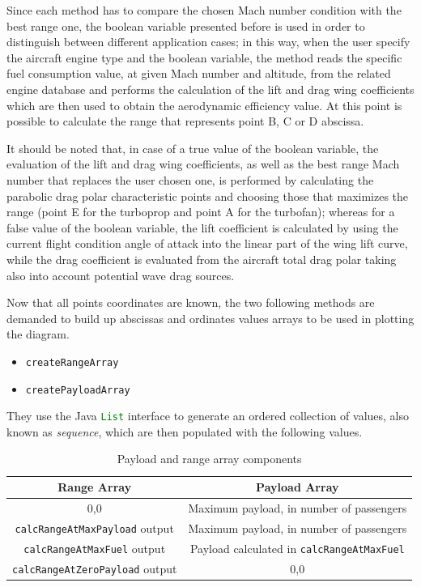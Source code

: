 \documentclass[a4paper,12pt,oneside]{book}
\begin{document}
\bigskip
Since each method has to compare the chosen Mach number condition with the best range one, the boolean variable presented before is used in order to distinguish between different application cases; in this way, when the user specify the aircraft engine type and the boolean variable, the method reads the specific fuel consumption value, at given Mach number and altitude, from the related engine database and performs the calculation of the lift and drag wing coefficients which are then used to obtain the aerodynamic efficiency value. At this point is possible to calculate the range that represents point B, C or D abscissa. 

It should be noted that, in case of a true value of the boolean variable, the evaluation of the lift and drag wing coefficients, as well as the best range Mach number that replaces the user chosen one, is performed by calculating the parabolic drag polar characteristic points and choosing those that maximizes the range (point E for the turboprop and point A for the turbofan); whereas for a false value of the boolean variable, the lift coefficient is calculated by using the current flight condition angle of attack into the linear part of the wing lift curve, while the drag coefficient is evaluated from the aircraft total drag polar taking also into account potential wave drag sources.   

\bigskip
Now that all points coordinates are known, the two following methods are demanded to build up abscissas and ordinates values arrays to be used in plotting the diagram.

\begin{itemize}
\item\lstinline[language=Java]!createRangeArray!
\item\lstinline[language=Java]!createPayloadArray!
\end{itemize}

\bigskip
They use the Java \lstinline[language=Java]!List! interface to generate an ordered collection of values, also known as \emph{sequence}, which are then populated with the following values.

\begin{table}[!hb]
\begin{tabular}{cc}
\toprule
\textbf{Range Array} & \textbf{Payload Array} \\ 
\midrule
0,0	& Maximum payload, in number of passengers \\ [0.2cm]
\lstinline[language=Java]!calcRangeAtMaxPayload! output &	Maximum payload, in number of passengers \\ [0.2cm]
\lstinline[language=Java]!calcRangeAtMaxFuel! output &	Payload calculated in \lstinline[language=Java]!calcRangeAtMaxFuel! \\ [0.2cm]
\lstinline[language=Java]!calcRangeAtZeroPayload! output &	0,0 \\ [0.2cm]
\bottomrule
\end{tabular}
\caption{Payload and range array components}
\label{table:Table3}
\end{table}
\end{document}
